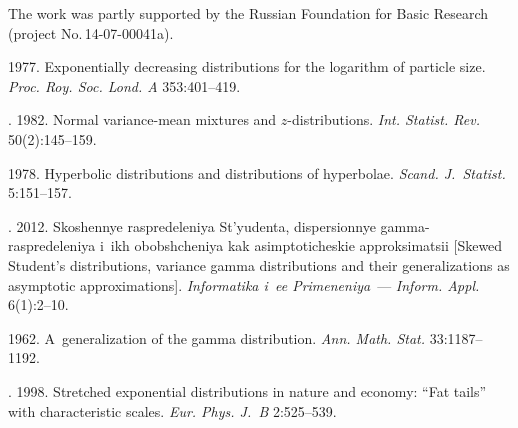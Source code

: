 

\Ack
\noindent
The work was partly supported by the Russian Foundation for Basic Research 
(project No.\,14-07-00041a).






  \begin{multicols}{2}

\renewcommand{\bibname}{\protect\rmfamily References}

{\small\frenchspacing
 {%
 \begin{thebibliography}{99}

 1977.
Exponentially decreasing distributions for the logarithm of particle size.
\textit{Proc. Roy. Soc. Lond. A} 353:401--419.

. 1982.
Normal variance-mean mixtures and \mbox{$z$-distributions}.
\textit{Int. Statist. Rev.} 50(2):145--159.

 1978.
Hyperbolic distributions and distributions of hyperbolae.
\textit{Scand. J.~Statist.} 5:151--157.



. 2012.
Skoshennye raspredeleniya St'yudenta, dispersionnye gamma-raspredeleniya 
i~ikh obobshcheniya kak asimptoticheskie approksimatsii
[Skewed Student's distributions, variance gamma distributions and their 
generalizations as asymptotic approximations].
\textit{Informatika i~ee Primeneniya}~--- \textit{Inform. Appl.} 6(1):2--10.

  1962.
A~generalization of the gamma distribution.
\textit{Ann. Math. Stat.} 33:1187--1192.

. 1998.
Stretched exponential distributions in nature and economy: ``Fat tails'' 
with characteristic scales.
\textit{Eur. Phys. J.~B} 2:525--539.


\end{thebibliography}}}
\end{multicols}
